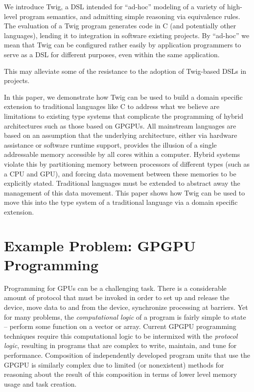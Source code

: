\documentclass[11pt]{article}
\begin{document}
We introduce Twig, a DSL intended for ``ad-hoc'' modeling of a variety of
high-level program semantics, and admitting simple reasoning via equivalence
rules. The evaluation of a Twig program generates code in C (and potentially
other languages), lending it to integration in software existing projects. By
``ad-hoc'' we mean that Twig can be configured rather easily by application
programmers to serve as a DSL for different purposes, even within the same
application. 


This may alleviate some of the resistance to the adoption of Twig-based DSLs
in projects.

In this paper, we demonstrate how Twig can be used to build a domain specific
extension to traditional languages like C to address what we believe are
limitations to existing type systems that complicate the programming of hybrid
architectures such as those based on GPGPUs. All mainstream languages are
based on an assumption that the underlying architecture, either via hardware
assistance or software runtime support, provides the illusion of a single
addressable memory accessible by all cores within a computer. Hybrid systems
violate this by partitioning memory between processors of different types
(such as a CPU and GPU), and forcing data movement between these memories to
be explicitly stated. Traditional languages must be extended to abstract away
the management of this data movement. This paper shows how Twig can be used to
move this into the type system of a traditional language via a domain specific
extension. %

\section{Example Problem: GPGPU Programming}

Programming for GPUs can be a challenging task. There is a considerable amount
of protocol that must be invoked in order to set up and release the device,
move data to and from the device, synchronize processing at barriers. Yet for
many problems, the \emph{computational logic} of a program is fairly simple to
state -- perform some function on a vector or array. Current GPGPU programming
techniques require this computational logic to be intermixed with the
\emph{protocol logic}, resulting in programs that are complex to write,
maintain, and tune for performance. Composition of independently developed
program units that use the GPGPU is similarly complex due to limited (or
nonexistent) methods for reasoning about the result of this composition in
terms of lower level memory usage and task creation.
\end{document}
